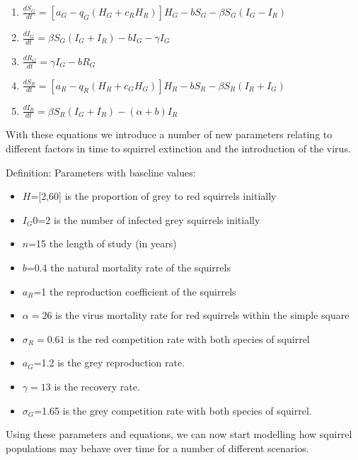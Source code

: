 \documentclass{article}
\begin{document}
\begin{enumerate}[label={(\arabic*)}]

\item $\frac{dS_{G}}{dt}=[a_{G}-q_{G}(H_{G}+c_{R}H_{R})]H_{G}-bS_{G}-\beta S_{G}(I_{G}-I_{R})$

\item $\frac{dI_{G}}{dt}=\beta S_{G}(I_{G}+I_{R})-bI_{G}-\gamma I_{G}$

\item $\frac{dR_{G}}{dt}=\gamma I_{G}-bR_{G}$

\item $\frac{dS_{R}}{dt}=[a_{R}-q_{R}(H_{R}+c_{G}H_{G})]H_{R}-bS_{R}-\beta S_{R}(I_{R}+I_{G})$

\item $\frac{dI_{R}}{dt}=\beta S_{R}(I_{G}+I_{R})-(\alpha + b)I_{R}$

\end{enumerate}

With these equations we introduce a number of new parameters relating to different factors in time to squirrel extinction and the introduction of the virus. 

Definition: Parameters with baseline values:

\begin{itemize}
\item $H$=[2,60]  is the proportion of grey to red squirrels initially
\item $I_{G}0$=2 is the number of infected grey squirrels initially
\item $n$=15 the length of study (in years)
\item $b$=0.4 the natural mortality rate of the squirrels
\item $a_{R}$=1 the reproduction coefficient of the squirrels
\item $\alpha=26$ is the virus mortality rate for red squirrels within the simple square
\item $\sigma_{R}=0.61$ is the red competition rate with both species of squirrel
\item $a_{G}$=1.2 is the grey reproduction rate.
\item $\gamma = 13$ is the recovery rate.
\item $\sigma_{G}$=1.65 is the grey competition rate with both species of squirrel.
\end{itemize}

Using these parameters and equations, we can now start modelling how squirrel populations may behave over time for a number of different scenarios. 
\end{document}
